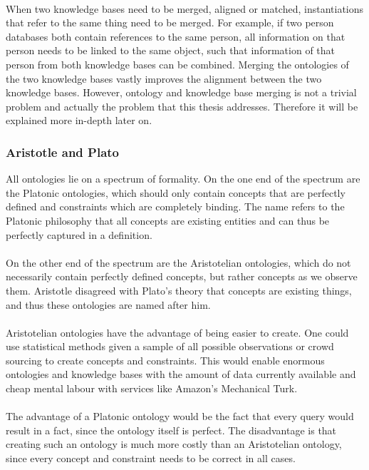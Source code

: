 \documentclass{article}
\begin{document}
 \paragraph{}
 When two knowledge bases need to be merged, aligned or matched, instantiations that refer to the same thing need to be merged. For example, if two person databases both contain references to the same person, all information on that person needs to be linked to the same object, such that information of that person from both knowledge bases can be combined. Merging the ontologies of the two knowledge bases vastly improves the alignment between the two knowledge bases. However, ontology and knowledge base merging is not a trivial problem and actually the problem that this thesis addresses. Therefore it will be explained more in-depth later on\cite{09ontology}.
 \subsubsection{Aristotle and Plato}
 All ontologies lie on a spectrum of formality. On the one end of the spectrum are the Platonic ontologies, which should only contain concepts that are perfectly defined and constraints which are completely binding. The name refers to the Platonic philosophy that all concepts are existing entities and can thus be perfectly captured in a definition.
 \paragraph{}
 On the other end of the spectrum are the Aristotelian ontologies, which do not necessarily contain perfectly defined concepts, but rather concepts as we observe them. Aristotle disagreed with Plato's theory that concepts are existing things, and thus these ontologies are named after him\cite{aristotleplato}.
 \paragraph{}
 Aristotelian ontologies have the advantage of being easier to create. One could use statistical methods given a sample of all possible observations or crowd sourcing to create concepts and constraints. This would enable enormous ontologies and knowledge bases with the amount of data currently available and cheap mental labour with services like Amazon's Mechanical Turk.
 \paragraph{}
 The advantage of a Platonic ontology would be the fact that every query would result in a fact, since the ontology itself is perfect. The disadvantage is that creating such an ontology is much more costly than an Aristotelian ontology, since every concept and constraint needs to be correct in all cases.
\end{document}
